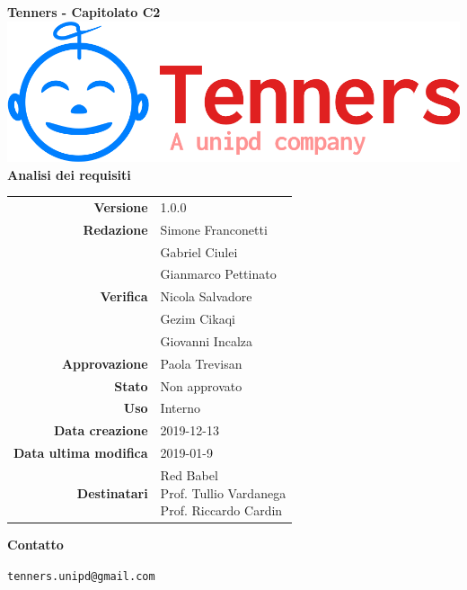 \begin{titlepage}
	\begin{center}
		\large \textbf{Tenners - Capitolato C2}
		\vfill
		\includegraphics[scale = 0.3]{./res/img/logo.png}\\
		\vfill
		\Huge \textbf{Analisi dei requisiti}

        \vfill
        \large

        \begin{tabular}{r|l}
                        \textbf{Versione} & 1.0.0 \\
                        \textbf{Redazione} &
                        Simone Franconetti\\&
                        Gabriel Ciulei \\&
												Gianmarco Pettinato \\
                        \textbf{Verifica} &
                        Nicola Salvadore \\&
												Gezim Cikaqi \\&
                        Giovanni Incalza \\
                        \textbf{Approvazione} & Paola Trevisan \\
                        \textbf{Stato} & Non approvato \\
                        \textbf{Uso} &  Interno\\
                        \textbf{Data creazione} &  2019-12-13\\
                        \textbf{Data ultima modifica} & 2019-01-9 \\
                        \textbf{Destinatari} & \parbox[t]{5cm}{Red Babel\\Prof. Tullio Vardanega\\Prof. Riccardo Cardin}
                \end{tabular}
                \vfill
                \normalsize
                \vfill
                \textbf{Contatto}

                \texttt{tenners.unipd@gmail.com}

	\end{center}
\end{titlepage}
